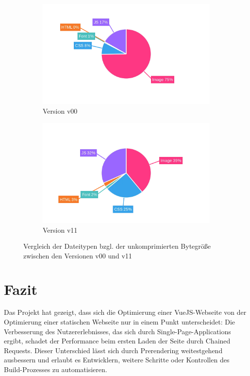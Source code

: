 \documentclass[11pt,a4paper]{article}
\begin{document}
\begin{figure}[h]
  \begin{subfigure}{.5\textwidth}
    \centering
    \includegraphics[width=.8\linewidth]{images/v00_content.png}
    \caption{Version v00}
    \label{fig:v00content}
  \end{subfigure}%
  \begin{subfigure}{.5\textwidth}
    \centering
    \includegraphics[width=.8\linewidth]{images/v11_content.png}
    \caption{Version v11}
    \label{fig:v11content}
  \end{subfigure}
  \caption{Vergleich der Dateitypen bzgl. der unkomprimierten Bytegröße zwischen den Versionen v00 und v11}
  \label{fig:content}
\end{figure}

\section{Fazit}
Das Projekt hat gezeigt, dass sich die Optimierung einer VueJS-Webseite von der Optimierung einer statischen Webseite nur in einem Punkt unterscheidet: Die Verbesserung des Nutzererlebnisses, das sich durch Single-Page-Applications ergibt, schadet der Performance beim ersten Laden der Seite durch Chained Requests.
Dieser Unterschied lässt sich durch Prerendering weitestgehend ausbessern und erlaubt es Entwicklern, weitere Schritte oder Kontrollen des Build-Prozesses zu automatisieren.
\end{document}
